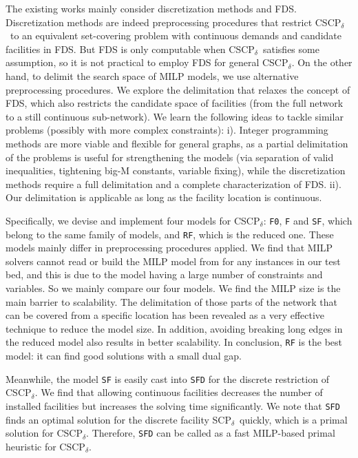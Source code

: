 \documentclass[review]{elsarticle}
\newcommand{\dlt}{{\delta}}
\newcommand{\problem}{CSCP$_\dlt$}
\newcommand{\dfproblem}{discrete facility SCP$_\dlt$}
\theoremstyle{definition}
\begin{document}
The existing works mainly consider discretization methods and FDS. Discretization methods are indeed preprocessing procedures that restrict \problem\ to an equivalent set-covering problem with continuous demands and candidate facilities in FDS. But FDS is only computable when \problem\ satisfies some assumption, so it is not practical to employ FDS  for general \problem. On the other hand, to delimit the search space of MILP models, we use alternative preprocessing procedures. We explore the delimitation that relaxes the concept of FDS,  which also restricts the candidate space of facilities (from the full network to a still continuous sub-network).  We learn the following ideas to tackle similar problems (possibly with more complex constraints): i). Integer programming methods are more viable and flexible for general graphs, as a partial delimitation of the problems is useful for  strengthening the models (via separation of valid inequalities, tightening big-M constants, variable fixing), while the discretization methods require a full delimitation and a complete characterization of FDS. ii). Our delimitation is applicable as long as the facility location is continuous.

 Specifically, we devise and implement four models for \problem:   \texttt{F0},  \texttt{F} and  \texttt{SF}, which belong to the same family of models, and \texttt{RF}, which is the reduced one. These models mainly differ in preprocessing procedures applied. We find that  MILP solvers cannot read or build  the MILP model from \cite{Hamacher20} for any instances in our test bed, and this is due to the model having a large number of constraints and variables. So we mainly compare our four models. We find the MILP size is the main barrier to scalability. The delimitation of those parts of the network that can be covered from a specific location has been revealed as a very effective technique to reduce the model size. In addition, avoiding breaking long edges in the reduced model also results in better scalability. In conclusion,
\texttt{RF} is the best model: it can find good solutions with a small dual gap.



Meanwhile, the model  \texttt{SF}  is easily cast into   \texttt{SFD} for the discrete restriction of \problem. We find that allowing continuous facilities decreases the number of installed facilities but increases the solving time significantly.  We note that \texttt{SFD} finds an optimal solution for  the \dfproblem \, quickly, which is a primal solution for \problem. Therefore, \texttt{SFD} can be called as a fast MILP-based primal heuristic for \problem.
\end{document}
